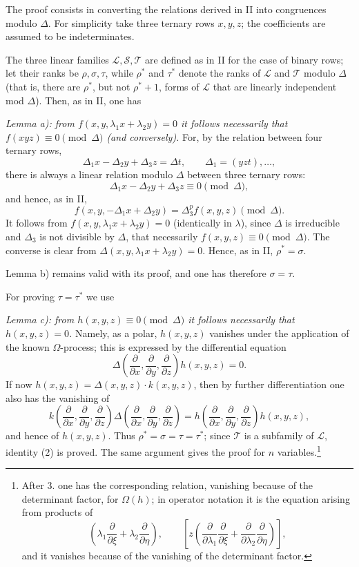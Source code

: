 \documentclass[11pt]{article}
\begin{document}
The proof consists in converting the relations derived in II into congruences modulo $\Delta$. For simplicity take three ternary rows $x,y,z$; the coefficients are assumed to be indeterminates.

The three linear families $\mathcal L,\mathcal S,\mathcal T$ are defined as in II for the case of binary rows; let their ranks be $\rho,\sigma,\tau$, while $\rho^*$ and $\tau^*$ denote the ranks of $\mathcal L$ and $\mathcal T$ modulo $\Delta$ (that is, there are $\rho^*$, but not $\rho^*+1$, forms of $\mathcal L$ that are linearly independent mod $\Delta$). Then, as in II, one has

\emph{Lemma a): from $f(x,y,\lambda_1x+\lambda_2y)=0$ it follows necessarily that $f(xyz)\equiv0\pmod{\Delta}$ (and conversely).} For, by the relation between four ternary rows,
\[
  \Delta_1x-\Delta_2y+\Delta_3z=\Delta t,
  \qquad \Delta_1=(yzt),\ldots,
\]
there is always a linear relation modulo $\Delta$ between three ternary rows:
\[
  \Delta_1x-\Delta_2y+\Delta_3z\equiv0\pmod{\Delta},
\]
and hence, as in II,
\[
  f(x,y,-\Delta_1x+\Delta_2y)=\Delta_3^p f(x,y,z)\pmod{\Delta}.
\]
It follows from $f(x,y,\lambda_1x+\lambda_2y)=0$ (identically in $\lambda$), since $\Delta$ is irreducible and $\Delta_3$ is not divisible by $\Delta$, that necessarily $f(x,y,z)\equiv0\pmod{\Delta}$. The converse is clear from $\Delta(x,y,\lambda_1x+\lambda_2y)=0$. Hence, as in II, $\rho^*=\sigma$.

Lemma b) remains valid with its proof, and one has therefore $\sigma=\tau$.

For proving $\tau=\tau^*$ we use

\emph{Lemma c): from $h(x,y,z)\equiv0\pmod{\Delta}$ it follows necessarily that $h(x,y,z)=0$.} Namely, as a polar, $h(x,y,z)$ vanishes under the application of the known $\Omega$-process; this is expressed by the differential equation
\[
  \Delta\!\left(\frac{\partial}{\partial x},\frac{\partial}{\partial y},\frac{\partial}{\partial z}\right)h(x,y,z)=0.
\]
If now $h(x,y,z)=\Delta(x,y,z)\cdot k(x,y,z)$, then by further differentiation one also has the vanishing of
\[
  k\!\left(\frac{\partial}{\partial x},\frac{\partial}{\partial y},\frac{\partial}{\partial z}\right)
  \Delta\!\left(\frac{\partial}{\partial x},\frac{\partial}{\partial y},\frac{\partial}{\partial z}\right)
  =
  h\!\left(\frac{\partial}{\partial x},\frac{\partial}{\partial y},\frac{\partial}{\partial z}\right)h(x,y,z),
\]
and hence of $h(x,y,z)$. Thus $\rho^*=\sigma=\tau=\tau^*$; since $\mathcal T$ is a subfamily of $\mathcal L$, identity (2) is proved. The same argument gives the proof for $n$ variables.\footnote{After 3. one has the corresponding relation, vanishing because of the determinant factor, for $\Omega(h)$; in operator notation it is the equation arising from products of
\[
 \left(\lambda_1\frac{\partial}{\partial \xi}+\lambda_2\frac{\partial}{\partial \eta}\right),
 \qquad
 \left[z\left(\frac{\partial}{\partial\lambda_1}\frac{\partial}{\partial \xi}
 +\frac{\partial}{\partial\lambda_2}\frac{\partial}{\partial \eta}\right)\right],
\]
and it vanishes because of the vanishing of the determinant factor.}
\end{document}
